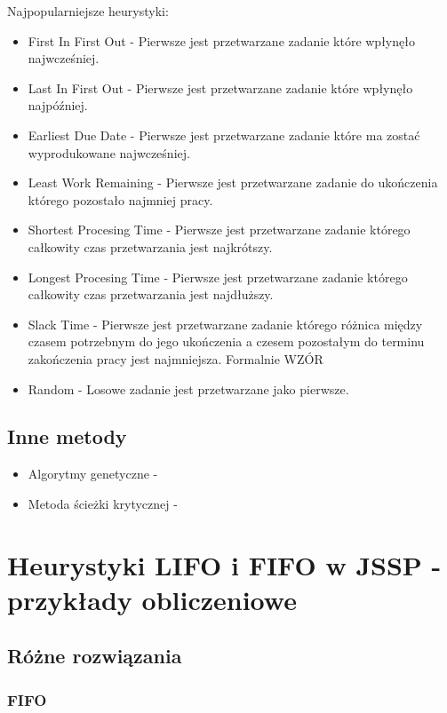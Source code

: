 \documentclass[twoside]{kInzynierka}
\begin{document}
Najpopularniejsze heurystyki:
\begin{itemize}
\item First In First Out - Pierwsze jest przetwarzane zadanie które wpłynęło najwcześniej.
\item Last In First Out - Pierwsze jest przetwarzane zadanie które wpłynęło najpóźniej.
\item Earliest Due Date - Pierwsze jest przetwarzane zadanie które ma zostać wyprodukowane najwcześniej.
\item Least Work Remaining - Pierwsze jest przetwarzane zadanie do ukończenia którego pozostało najmniej pracy.
\item Shortest Procesing Time - Pierwsze jest przetwarzane zadanie którego całkowity czas przetwarzania jest najkrótszy.
\item Longest Procesing Time - Pierwsze jest przetwarzane zadanie którego całkowity czas przetwarzania jest najdłuższy.
\item Slack Time - Pierwsze jest przetwarzane zadanie którego różnica między czasem potrzebnym do jego ukończenia a czesem pozostałym do terminu zakończenia pracy jest najmniejsza. Formalnie WZÓR
\item Random - Losowe zadanie jest przetwarzane jako pierwsze.
\end{itemize}
\subsection     {Inne metody}
\begin{itemize}
\item Algorytmy genetyczne - 
\item Metoda ścieżki krytycznej - 

\end{itemize}

\section        [Heurystyki LIFO i FIFO \ldots]
                {Heurystyki LIFO i FIFO w JSSP \newline - przykłady obliczeniowe}

\subsection     {Różne rozwiązania}
\subsubsection  {FIFO}
\end{document}
